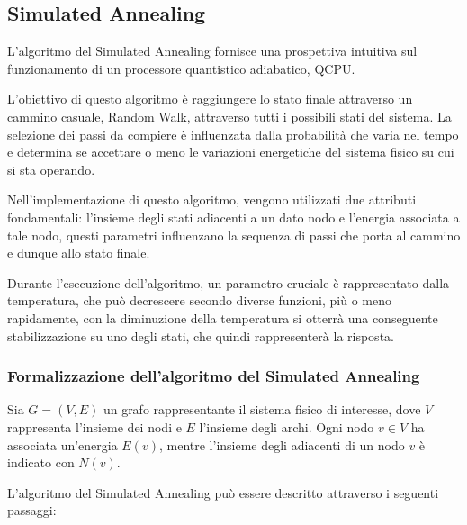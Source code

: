 \documentclass{article}
\begin{document}
\subsection{Simulated Annealing}

L'algoritmo del Simulated Annealing fornisce una prospettiva intuitiva sul funzionamento di un processore quantistico adiabatico, QCPU.

L'obiettivo di questo algoritmo è raggiungere lo stato finale attraverso un cammino casuale, Random Walk, attraverso tutti i possibili stati del sistema. La selezione dei passi da compiere è influenzata dalla probabilità che varia nel tempo e determina se accettare o meno le variazioni energetiche del sistema fisico su cui si sta operando.

Nell'implementazione di questo algoritmo, vengono utilizzati due attributi fondamentali: l'insieme degli stati adiacenti a un dato nodo e l'energia associata a tale nodo, questi parametri influenzano la sequenza di passi che porta al cammino e dunque allo stato finale.

Durante l'esecuzione dell'algoritmo, un parametro cruciale è rappresentato dalla temperatura, che può decrescere secondo diverse funzioni, più o meno rapidamente, con la diminuzione della temperatura si otterrà una conseguente stabilizzazione su uno degli stati, che quindi rappresenterà la risposta.

\subsubsection*{Formalizzazione dell'algoritmo del Simulated Annealing}

Sia $G=(V,E)$ un grafo rappresentante il sistema fisico di interesse, dove $V$ rappresenta l'insieme dei nodi e $E$ l'insieme degli archi. Ogni nodo $v \in V$ ha associata un'energia $E(v)$, mentre l'insieme degli adiacenti di un nodo $v$ è indicato con $N(v)$.

L'algoritmo del Simulated Annealing può essere descritto attraverso i seguenti passaggi:
\end{document}
